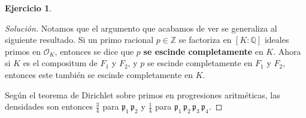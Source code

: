 \documentclass{article}
\newcounter{tarea}
\theoremstyle{definition}
\newtheorem{ejercicio}{Ejercicio}[tarea]
\newenvironment{solucion}{\begin{proof}[Solución]}{\end{proof}}
\newcommand{\ZZ}{\mathbb{Z}}
\newcommand{\QQ}{\mathbb{Q}}
\renewcommand{\O}{\mathcal{O}}
\begin{document}
\begin{ejercicio}
\begin{solucion}
    Notamos que el argumento que acabamos de ver se generaliza al siguiente
    resultado. Si un primo racional $p \in \ZZ$ se factoriza en $[K : \QQ]$
    ideales primos en $\O_K$, entonces se dice que $p$
    \textbf{se escinde completamente} en $K$. Ahora si $K$ es el compositum de
    $F_1$ y $F_2$, y $p$ se escinde completamente en $F_1$ y $F_2$, entonces este
    también se escinde completamente en $K$.

    Según el teorema de Dirichlet sobre primos en progresiones aritméticas,
    las densidades son entonces $\frac{3}{4}$ para
    $\mathfrak{p}_1\,\mathfrak{p}_2$ y $\frac{1}{4}$ para
    $\mathfrak{p}_1 \, \mathfrak{p}_2 \, \mathfrak{p}_3 \, \mathfrak{p}_4$.
  \end{solucion}
  \fi
\end{ejercicio}
\end{document}
